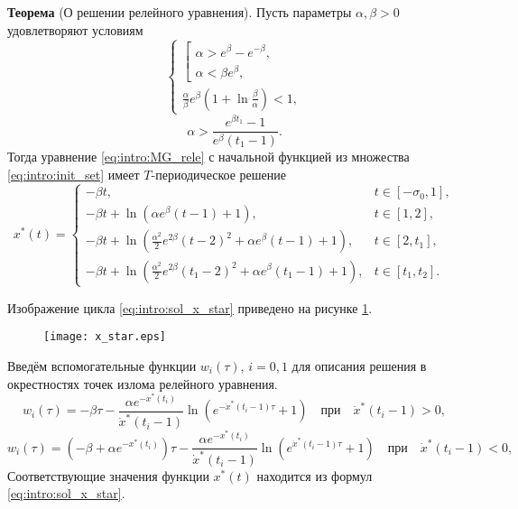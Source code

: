 \textbf{Теорема} (О решении релейного уравнения).
	Пусть параметры $\alpha, \beta > 0$ удовлетворяют условиям
	\begin{equation}
		\label{eq:intro:cond_alpha1}
		\begin{cases}
			\left[
			\begin{array}{ll}
				\alpha > e^{\beta} - e^{-\beta},\\
				\alpha < \beta e^{\beta},
			\end{array}
			\right.\\
			\frac{\alpha}{\beta}e^{\beta}\left(1 + \ln\frac{\beta}{\alpha}\right) < 1,
		\end{cases}
	\end{equation}
	\begin{equation}
		\label{eq:intro:cond_alpha2}
		\alpha > \dfrac{e^{\beta t_1} - 1}{e^{\beta}(t_1 - 1)}.
	\end{equation}
	Тогда уравнение \eqref{eq:intro:MG_rele} с начальной функцией из множества \eqref{eq:intro:init_set} имеет $T$-периодическое решение
	\small
	\begin{equation}
		\label{eq:intro:sol_x_star}
		x^*(t)= 
		\begin{cases}
			-\beta t, & t\in[-\sigma_0, 1],\\
			-\beta t +\ln(\alpha e^{\beta}(t - 1)+1), & t\in[1, 2],\\
			-\beta t + \ln(\frac{\alpha^2}{2}e^{2\beta}(t - 2)^2+\alpha e^{\beta}(t - 1)+1), & t\in[2, t_1],\\
			-\beta t + \ln(\frac{\alpha^2}{2}e^{2\beta}(t_1 - 2)^2+\alpha e^{\beta}(t_1 - 1) + 1), & t\in[t_1, t_2].
		\end{cases}
	\end{equation}
	\normalsize

Изображение цикла \eqref{eq:intro:sol_x_star} приведено на рисунке \ref{fig:intro:x_star:ch1}.

\begin{figure}
	\centering
	\texttt{[image: x\_star.eps]}
	\label{fig:intro:x_star:ch1}
\end{figure}

Введём вспомогательные функции $w_i(\tau)$, $i = 0, 1$ для описания решения в окрестностях точек излома релейного уравнения.
\[
w_i(\tau) = -\beta \tau - \dfrac{\alpha e^{-x^*(t_i)}}{\dot{x}^*(t_i - 1)} \ln\left(e^{-\dot{x}^*(t_i - 1)\tau} + 1\right) \quad \text{при} \quad \dot{x}^*(t_i - 1) > 0,
\]
\[
w_i(\tau) = (-\beta + \alpha e^{-x^*(t_i)})\tau - \dfrac{\alpha e^{-x^*(t_i)}}{\dot{x}^*(t_i - 1)} \ln\left(e^{\dot{x}^*(t_i - 1)\tau} + 1\right) \quad \text{при} \quad \dot{x}^*(t_i - 1) < 0,
\]
Соответствующие значения функции $x^*(t)$ находится из формул \eqref{eq:intro:sol_x_star}.

